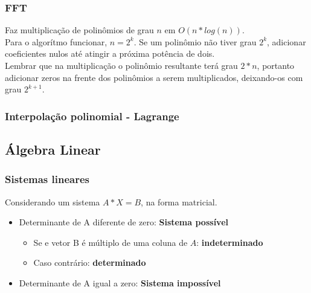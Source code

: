 \divisor

\subsubsection{FFT}
Faz multiplica\c{c}\~{a}o de polin\^{o}mios de grau $n$ em $O(n*log(n))$.\\
Para o algor\'{i}tmo funcionar, $n=2^k$. Se um polin\^{o}mio n\~{a}o tiver grau $2^k$, adicionar coeficientes nulos at\'{e} atingir a pr\'{o}xima pot\^{e}ncia de dois.\\
Lembrar que na multiplica\c{c}\~{a}o o polin\^{o}mio resultante ter\'{a} grau $2*n$, portanto adicionar zeros na frente dos polin\^{o}mios a serem multiplicados, deixando-os com grau $2^{k+1}$.

\divisor

\subsubsection{Interpola\c{c}\~{a}o polinomial - Lagrange}


\subsection{Álgebra Linear}

\subsubsection{Sistemas lineares}
Considerando um sistema $A*X=B$, na forma matricial.
\begin{itemize}
    \item Determinante de A diferente de zero: \textbf{Sistema poss\'{i}vel}
		\begin{itemize}
			\item Se e vetor B \'{e} m\'{u}ltiplo de uma coluna de $A$: \textbf{indeterminado}
			\item Caso contr\'{a}rio: \textbf{determinado}
		\end{itemize}
    \item Determinante de A igual a zero: \textbf{Sistema imposs\'{i}vel}
\end{itemize}

